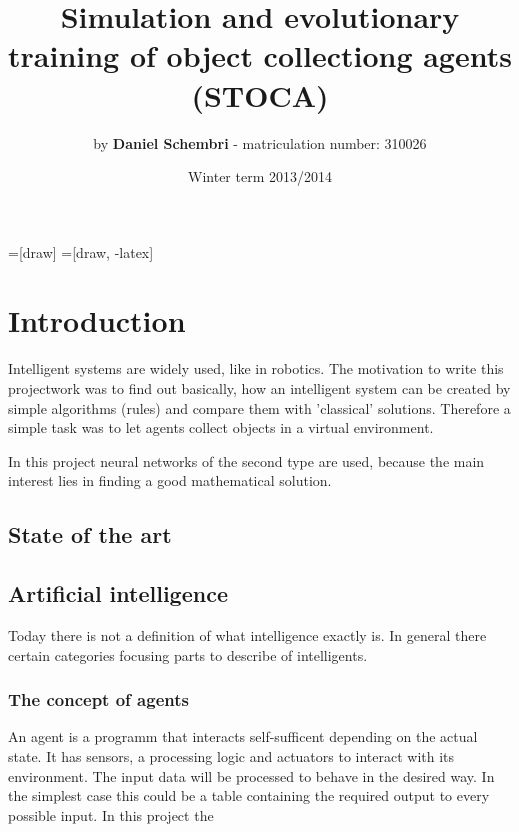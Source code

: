 \documentclass[10pt,a4paper,DIV=11]{scrreprt}
\title
{
    Simulation and evolutionary training of object collectiong agents (STOCA)\\
}
\author
{
    by \textbf{Daniel Schembri} - matriculation number: 310026
}
\date
{
    Winter term 2013/2014
}
\begin{document}
=[draw]
=[draw, -latex] 


\maketitle
\thispagestyle{empty}
\newpage
{\large\tableofcontents}
\newpage

% 
%
%
%
%



\chapter{Introduction}
Intelligent systems are widely used, like in robotics.
The motivation to write this projectwork was
to find out basically, how an intelligent system can be created by simple algorithms (rules) and compare them with 'classical' solutions. Therefore a simple task was to let agents collect objects in a virtual environment.



In this project neural networks of the second type are used, because the main interest lies in finding a good mathematical solution.



\section{State of the art}

\section{Artificial intelligence}
Today there is not a definition of what intelligence exactly is.
In general there certain categories focusing parts to describe of
intelligents.

\subsection{}


\subsection{The concept of agents}
An agent is a programm that interacts self-sufficent depending on the actual state. It has sensors, a processing logic and actuators to interact with its environment. The input data will be processed to behave in the desired way. In the simplest case this could be a table containing the required output to every possible input. In this project the 
\end{document}
